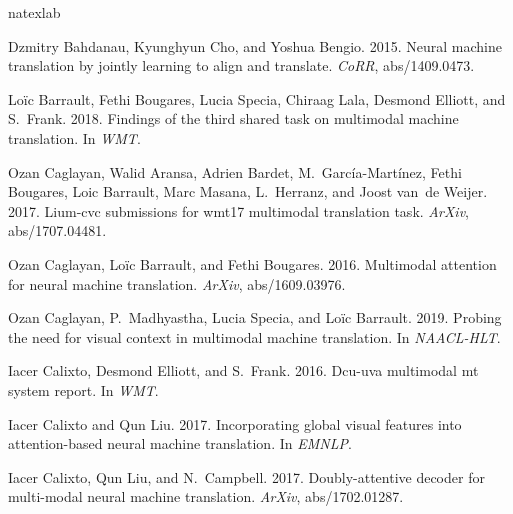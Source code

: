 \documentclass[11pt]{article}
\begin{document}
\begin{thebibliography}{36}
\expandafter\ifx\csname natexlab\endcsname\relax\def\natexlab#1{#1}\fi

Dzmitry Bahdanau, Kyunghyun Cho, and Yoshua Bengio. 2015.
\newblock Neural machine translation by jointly learning to align and
  translate.
\newblock \emph{CoRR}, abs/1409.0473.

Lo{\"i}c Barrault, Fethi Bougares, Lucia Specia, Chiraag Lala, Desmond Elliott,
  and S.~Frank. 2018.
\newblock Findings of the third shared task on multimodal machine translation.
\newblock In \emph{WMT}.

Ozan Caglayan, Walid Aransa, Adrien Bardet, M.~Garc{\'i}a-Mart{\'i}nez, Fethi
  Bougares, Loic Barrault, Marc Masana, L.~Herranz, and Joost van~de Weijer.
  2017.
\newblock Lium-cvc submissions for wmt17 multimodal translation task.
\newblock \emph{ArXiv}, abs/1707.04481.

Ozan Caglayan, Lo{\"i}c Barrault, and Fethi Bougares. 2016.
\newblock Multimodal attention for neural machine translation.
\newblock \emph{ArXiv}, abs/1609.03976.

Ozan Caglayan, P.~Madhyastha, Lucia Specia, and Lo{\"i}c Barrault. 2019.
\newblock Probing the need for visual context in multimodal machine
  translation.
\newblock In \emph{NAACL-HLT}.

Iacer Calixto, Desmond Elliott, and S.~Frank. 2016.
\newblock Dcu-uva multimodal mt system report.
\newblock In \emph{WMT}.

Iacer Calixto and Qun Liu. 2017.
\newblock Incorporating global visual features into attention-based neural
  machine translation.
\newblock In \emph{EMNLP}.

Iacer Calixto, Qun Liu, and N.~Campbell. 2017.
\newblock Doubly-attentive decoder for multi-modal neural machine translation.
\newblock \emph{ArXiv}, abs/1702.01287.


\end{thebibliography}
\end{document}
